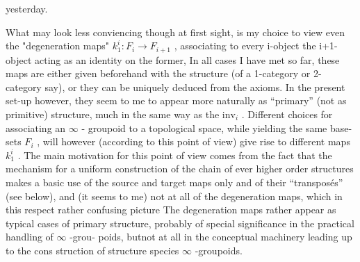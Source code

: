 
yesterday.

What may look less conviencing though at first sight, is my choice
to view  even the "degeneration maps" $k^{i}_{1} : F_{i} \to F_{i+1}$ , associating to
every i-object the \hand{(}i+1\unsure{\hand{)}}-object acting as an identity on the former, In
all cases I have met so far, these maps are either given beforehand with
the structure (of a 1-category or 2-category\hand{,} say), or they can be uniquely
deduced from the axioms. In the present set-up however, they seem to me
to appear more naturally as ``primary'' (not as primitive) structure, much
in the same way as the $\mathrm{inv}_{i}$ . Different choices for associating an $\infty$ -
groupoid to a topological space, while yielding the same base-sets $F_{i}$ ,
will however (according to this point of view) give rise to different
maps $k^{i}_{1}$ . The main motivation for this point of view comes from the fact
that the mechanism for a uniform construction of the chain of ever higher
order structures makes a basic use of the source and target maps only and
of their ``transposés'' (see below), and (it seems to me) not at all of the
degeneration maps, which in this respect  rather  confusing   picture 
\margin{(}The degeneration maps rather appear as typical cases of primary structure,
probably of special significance in the practical handling of $\infty$ -grou-%
poids, but\hand{/}not at all in the conceptual machinery leading up to the cons
struction of  structure species $\infty$ -groupoids.

